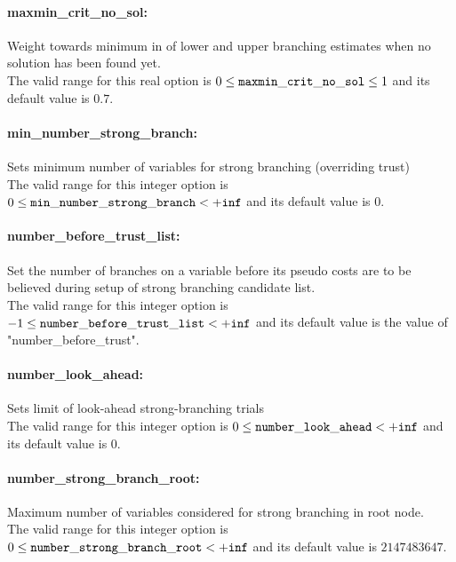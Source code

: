 \paragraph{maxmin\_crit\_no\_sol:}\label{sec:maxmin_crit_no_sol} Weight towards minimum in of lower and upper branching estimates when no solution has been found yet. $\;$ \\
 The valid range for this real option is 
$0 \le {\tt maxmin\_crit\_no\_sol } \le 1$
and its default value is $0.7$.


\paragraph{min\_number\_strong\_branch:}\label{sec:min_number_strong_branch} Sets minimum number of variables for strong branching (overriding trust) $\;$ \\
 The valid range for this integer option is
$0 \le {\tt min\_number\_strong\_branch } <  {\tt +inf}$
and its default value is $0$.


\paragraph{number\_before\_trust\_list:}\label{sec:number_before_trust_list} Set the number of branches on a variable before its pseudo costs are to be believed during setup of strong branching candidate list. $\;$ \\
The valid range for this integer option is
$-1 \le {\tt number\_before\_trust\_list } <  {\tt +inf}$
and its default value is the value of "number\_before\_trust".

\paragraph{number\_look\_ahead:}\label{sec:number_look_ahead} Sets limit of look-ahead strong-branching trials $\;$ \\
 The valid range for this integer option is
$0 \le {\tt number\_look\_ahead } <  {\tt +inf}$
and its default value is $0$.


\paragraph{number\_strong\_branch\_root:}\label{sec:number_strong_branch_root} Maximum number of variables considered for strong branching in root node. $\;$ \\
 The valid range for this integer option is
$0 \le {\tt number\_strong\_branch\_root } <  {\tt +inf}$
and its default value is $2147483647$.


